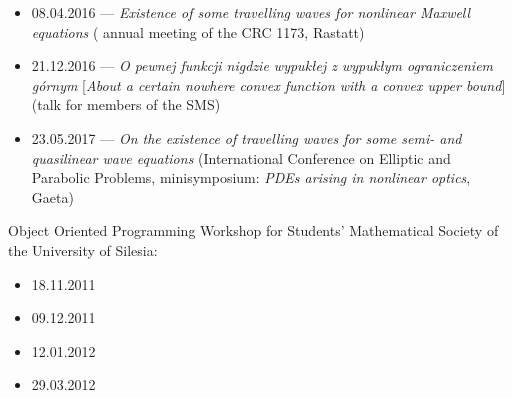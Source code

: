 \begin{itemize}
  \item 08.04.2016 --- \textsl{Existence of some travelling waves for nonlinear Maxwell equations} ( annual meeting of the CRC 1173, Rastatt)
  \item 21.12.2016 --- \textsl{O pewnej funkcji nigdzie wypukłej z wypukłym ograniczeniem górnym} [\textsl{About a certain nowhere convex function with a convex upper bound}] (talk for members of the SMS)
  \item 23.05.2017 --- \textsl{On the existence of travelling waves for some semi- and quasilinear wave equations} (International Conference on Elliptic and Parabolic Problems, minisymposium: \textit{PDEs arising in nonlinear optics}, Gaeta)
\end{itemize}
\noindent Object Oriented Programming Workshop for Students' Mathematical Society of the University of Silesia:
\begin{itemize}
  \item 18.11.2011
  \item 09.12.2011
  \item 12.01.2012
  \item 29.03.2012
\end{itemize}
